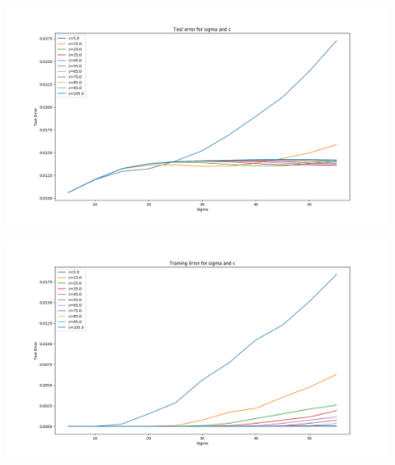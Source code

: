 \begin{figure}[!h]
\begin{center}
\centering
\includegraphics[width=1\textwidth]{figures/new/3_Figure_3}
\end{center}
\caption{\label{fig:3_3} }
\end{figure}

\begin{figure}[!h]
\begin{center}
\centering
\includegraphics[width=1\textwidth]{figures/new/3_Figure_4}
\end{center}
\caption{\label{fig:3_4} }
\end{figure}



